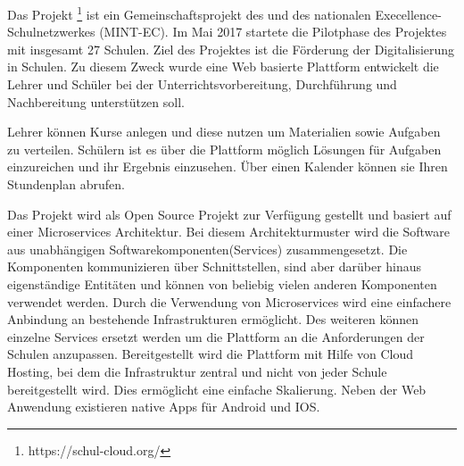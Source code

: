Das Projekt \schulCloud\footnote{https://schul-cloud.org/} ist ein Gemeinschaftsprojekt des \hpi und des nationalen Execellence-Schulnetzwerkes (MINT-EC). Im Mai 2017 startete die Pilotphase des Projektes mit insgesamt 27 Schulen. Ziel des Projektes ist die Förderung der Digitalisierung in Schulen. 
Zu diesem Zweck wurde eine Web basierte Plattform entwickelt die Lehrer und Schüler bei der Unterrichtsvorbereitung, Durchführung und Nachbereitung unterstützen soll. 

Lehrer können Kurse anlegen und diese nutzen um Materialien sowie Aufgaben zu verteilen. Schülern ist es über die Plattform möglich Lösungen für Aufgaben einzureichen und ihr Ergebnis einzusehen. Über einen Kalender können sie Ihren Stundenplan abrufen.

Das Projekt wird als Open Source Projekt zur Verfügung gestellt und basiert auf einer Microservices Architektur. Bei diesem Architekturmuster wird die Software aus unabhängigen Softwarekomponenten(Services) zusammengesetzt. Die Komponenten kommunizieren über Schnittstellen, sind aber darüber hinaus eigenständige Entitäten und können von beliebig vielen anderen Komponenten verwendet werden. Durch die Verwendung von Microservices wird eine einfachere Anbindung an bestehende Infrastrukturen ermöglicht. Des weiteren können einzelne Services ersetzt werden um die Plattform an die Anforderungen der Schulen anzupassen. Bereitgestellt wird die Plattform mit Hilfe von Cloud Hosting, bei dem die Infrastruktur zentral und nicht von jeder Schule bereitgestellt wird. Dies ermöglicht eine einfache Skalierung. Neben der Web Anwendung existieren native Apps für Android und IOS.


%
%
%
%
%




